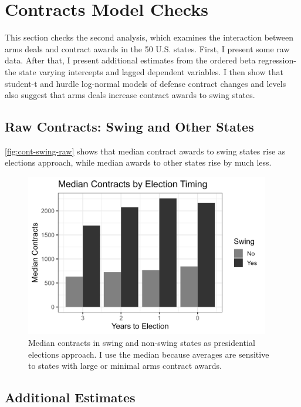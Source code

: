\documentclass[12pt]{article}
\begin{document}
\newpage



\section{Contracts Model Checks} 

This section checks the second analysis, which examines the interaction between arms deals and contract awards in the 50 U.S. states. 
First, I present some raw data. 
After that, I present additional estimates from the ordered beta regression- the state varying intercepts and lagged dependent variables. 
I then show that student-t and hurdle log-normal models of defense contract changes and levels also suggest that arms deals increase contract awards to swing states. 

\subsection{Raw Contracts: Swing and Other States}

\autoref{fig:cont-swing-raw} shows that median contract awards to swing states rise as elections approach, while median awards to other states rise by much less. 

\begin{figure}[htpb]
	\centering
		\includegraphics[width=0.95\textwidth]{cont-swing-raw.png}
	\caption{Median contracts in swing and non-swing states as presidential elections approach. I use the median because averages are sensitive to states with large or minimal arms contract awards. }
	\label{fig:cont-swing-raw}
\end{figure}


\subsection{Additional Estimates}
\end{document}
